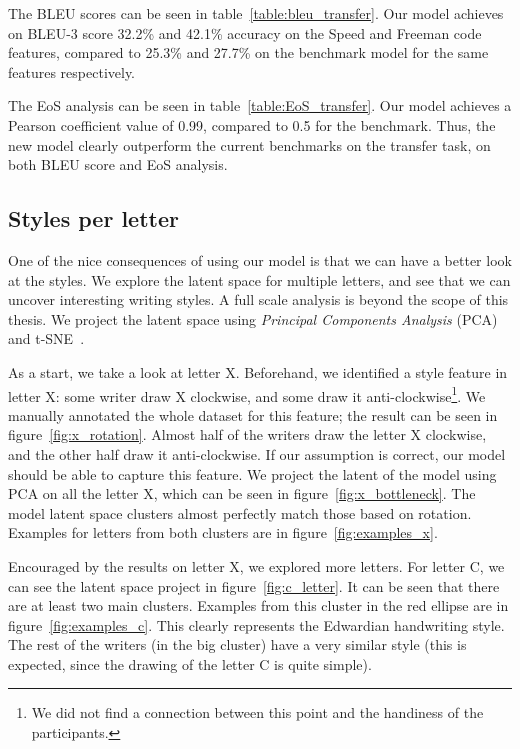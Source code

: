   \par The BLEU scores can be seen in table~\ref{table:bleu_transfer}. Our model achieves on BLEU-3 score 32.2\% and 42.1\% accuracy on the Speed and Freeman code features, compared to 25.3\% and 27.7\% on the benchmark model for the same features respectively.
  \par The EoS analysis can be seen in table~\ref{table:EoS_transfer}. Our model achieves a Pearson coefficient value of 0.99, compared to 0.5 for the benchmark.
  Thus, the new model clearly outperform the current benchmarks on the transfer task, on both BLEU score and EoS analysis.

  \subsection{Styles per letter} \label{ch:framework_sec:styleperletter}
  \par One of the nice consequences of using our model is that we can have a better look at the styles. We explore the latent space for multiple letters, and see that we can uncover interesting writing styles. A full scale analysis is beyond the scope of this thesis. We project the latent space using \textit{Principal Components Analysis} (PCA)~\citep{jolliffe2011principal} and t-SNE~\citep{maaten2008visualizing}.

  \par As a start, we take a look at letter X. Beforehand, we identified a style feature in letter X: some writer draw X clockwise, and some draw it anti-clockwise\footnote{We did not find a connection between this point and the handiness of the participants.}. We manually annotated the whole dataset for this feature; the result can be seen in figure~\ref{fig:x_rotation}. Almost half of the writers draw the letter X clockwise, and the other half draw it anti-clockwise. If our assumption is correct, our model should be able to capture this feature. We project the latent  of the model using PCA on all the letter X, which can be seen in figure~\ref{fig:x_bottleneck}. The model latent space clusters almost perfectly match those based on rotation. Examples for letters from both clusters are in figure~\ref{fig:examples_x}.

  \par Encouraged by the results on letter X, we explored more letters. For letter C, we can see the latent space project in figure~\ref{fig:c_letter}. It can be seen that there are at least two main clusters. Examples from this cluster in the red ellipse are in figure~\ref{fig:examples_c}. This clearly represents the Edwardian handwriting style. The rest of the writers (in the big cluster) have a very similar style (this is expected, since the drawing of the letter C is quite simple).

